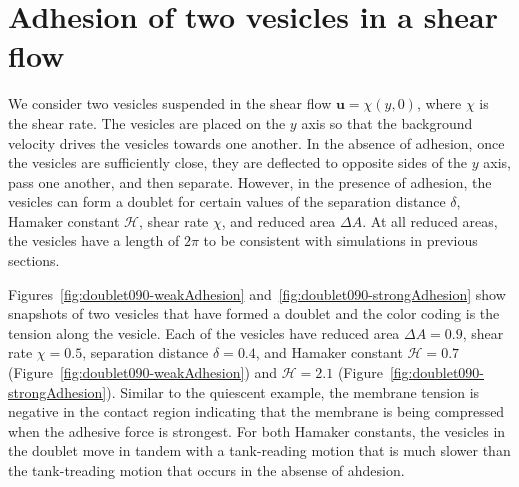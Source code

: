 \documentclass[prf,superscriptaddress,showkeys]{revtex4-1}
\newcommand{\uu}{\mathbf{u}}
\begin{document}
\section{Adhesion of two vesicles in a shear flow}
\label{sec:sflow} 
We consider two vesicles suspended in the shear flow $\uu = \chi(y,0)$,
where $\chi$ is the shear rate.  The vesicles are placed on the $y$ axis
so that the background velocity drives the vesicles towards one another.
In the absence of adhesion, once the vesicles are sufficiently close,
they are deflected to opposite sides of the $y$ axis, pass one another,
and then separate.  However, in the presence of adhesion, the vesicles
can form a doublet for certain values of the separation distance
$\delta$, Hamaker constant $\mathcal{H}$, shear rate $\chi$, and reduced
area $\Delta A$.  At all reduced areas, the vesicles have a length of
$2\pi$ to be consistent with simulations in previous sections.  

Figures~\ref{fig:doublet090-weakAdhesion}
and~\ref{fig:doublet090-strongAdhesion} show snapshots of two vesicles
that have formed a doublet and the color coding is the tension along the
vesicle.  Each of the vesicles have reduced area $\Delta A = 0.9$, shear
rate $\chi = 0.5$, separation distance $\delta = 0.4$, and Hamaker
constant $\mathcal{H} = 0.7$ (Figure~\ref{fig:doublet090-weakAdhesion})
and $\mathcal{H} = 2.1$ (Figure~\ref{fig:doublet090-strongAdhesion}).
Similar to the quiescent example, the membrane tension is negative in
the contact region indicating that the membrane is being compressed when
the adhesive force is strongest.  For both Hamaker constants, the
vesicles in the doublet move in tandem with a tank-reading motion that
is much slower than the tank-treading motion that occurs in the absense
of ahdesion.  
\end{document}
